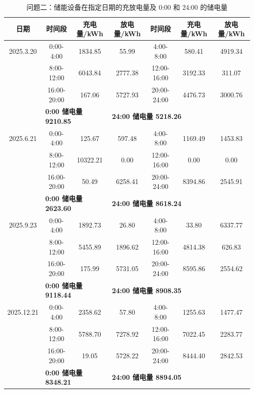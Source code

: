 \documentclass[withoutpreface]{cumcmthesis}
\newcommand{\hd}[1]{\textbf{#1}}
\begin{document}
\begin{table}[!htbp]
  \centering
  \caption{问题二：储能设备在指定日期的充放电量及 0:00 和 24:00 的储电量}
  \label{tab:q2t2}
  \begin{tabular}{c c c c c c c}
    \toprule[1.5pt]
    \hd{日期} & \hd{时间段} & \hd{充电量/kWh} & \hd{放电量/kWh} & \hd{时间段} & \hd{充电量/kWh} & \hd{放电量/kWh}\\
    \midrule[1pt]
    2025.3.20 & 0:00-4:00 & 1834.85 & 55.99 & 4:00-8:00 & 580.41 & 4919.34\\
    & 8:00-12:00 & 6043.84 & 2777.38 & 12:00-16:00 & 3192.33 & 311.07\\
    & 16:00-20:00 & 167.06 & 5727.93 & 20:00-24:00 & 4476.73 & 3000.76\\
    & \multicolumn{2}{l}{\hd{0:00 储电量 9210.85}} & \multicolumn{3}{l}{\hd{24:00 储电量 5218.26}}\\
    \midrule[1pt]
    2025.6.21 & 0:00-4:00 & 125.67 & 597.48 & 4:00-8:00 & 1169.49 & 1453.83\\
    & 8:00-12:00 & 10322.21 & 0.00 & 12:00-16:00 & 0.00 & 0.00\\
    & 16:00-20:00 & 50.49 & 6258.41 & 20:00-24:00 & 8394.86 & 2545.91\\
    & \multicolumn{2}{l}{\hd{0:00 储电量 2623.60}} & \multicolumn{3}{l}{\hd{24:00 储电量 8618.24}}\\
    \midrule[1pt]
    2025.9.23 & 0:00-4:00 & 1892.73 & 26.80 & 4:00-8:00 & 33.80 & 6337.77\\
    & 8:00-12:00 & 5455.89 & 1896.62 & 12:00-16:00 & 4814.38 & 626.83\\
    & 16:00-20:00 & 175.99 & 5731.05 & 20:00-24:00 & 8595.86 & 2554.62\\
    & \multicolumn{2}{l}{\hd{0:00 储电量 9118.44}} & \multicolumn{3}{l}{\hd{24:00 储电量 8908.35}}\\
    \midrule[1pt]
    2025.12.21 & 0:00-4:00 & 2358.62 & 57.80 & 4:00-8:00 & 1255.63 & 1477.47\\
    & 8:00-12:00 & 5788.70 & 7278.92 & 12:00-16:00 & 7022.45 & 2283.77\\
    & 16:00-20:00 & 19.05 & 5728.22 & 20:00-24:00 & 8444.40 & 2842.53\\
    & \multicolumn{2}{l}{\hd{0:00 储电量 8348.21}} & \multicolumn{3}{l}{\hd{24:00 储电量 8894.05}}\\
    \bottomrule[1.5pt]
  \end{tabular}
\end{table}
\end{document}
